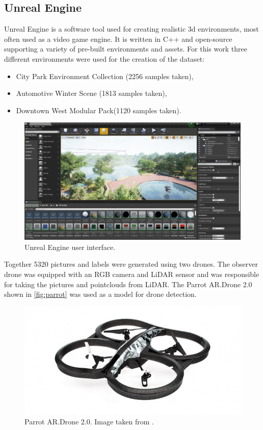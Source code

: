 \documentclass[twoside]{ctuthesis}
\theoremstyle{plain}
\theoremstyle{definition}
\theoremstyle{note}
\begin{document}
\subsection{Unreal Engine}
Unreal Engine is a software tool used for creating realistic 3d environments, most often used as a video game engine. It is written in C++ and open-source supporting a variety of pre-built environments and assets. For this work three different environments were used for the creation of the dataset:
\begin{itemize}
	\item City Park Environment Collection (2256 samples taken),
	\item Automotive Winter Scene (1813 samples taken),
	\item Downtown West Modular Pack(1120 samples taken).
\end{itemize}
\begin{figure}
	\centering
	\includegraphics[width=\textwidth]{unreal_ui.png}
	\caption{Unreal Engine user interface.}
\end{figure}
Together 5320 pictures and labels were generated using two drones. The observer drone was equipped with an RGB camera and LiDAR sensor and was responsible for taking the pictures and pointclouds from LiDAR. The Parrot AR.Drone 2.0 shown in \autoref{fig:parrot} was used as a model for drone detection.
\begin{figure}
	\centering
	\includegraphics[width=\textwidth]{parrot.png}
	\caption{Parrot AR.Drone 2.0. Image taken from \cite{parrot}.}
	\label{fig:parrot}
\end{figure}
\end{document}
